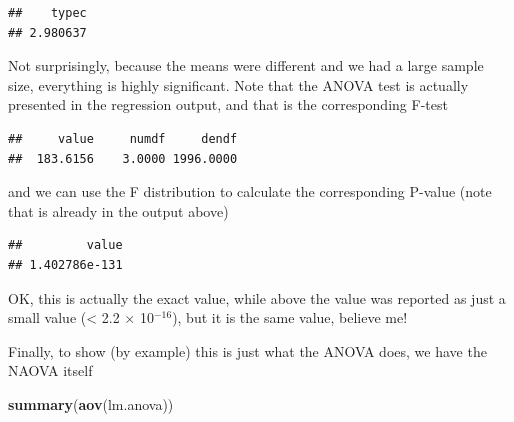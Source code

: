 \documentclass[
]{book}
\newenvironment{Shaded}{\begin{snugshade}}{\end{snugshade}}
\newcommand{\DecValTok}[1]{\textcolor[rgb]{0.00,0.00,0.81}{#1}}
\newcommand{\FunctionTok}[1]{\textcolor[rgb]{0.13,0.29,0.53}{\textbf{#1}}}
\newcommand{\NormalTok}[1]{#1}
\newcommand{\OtherTok}[1]{\textcolor[rgb]{0.56,0.35,0.01}{#1}}
\newcommand{\SpecialCharTok}[1]{\textcolor[rgb]{0.81,0.36,0.00}{\textbf{#1}}}
\begin{document}
\begin{verbatim}
##    typec 
## 2.980637
\end{verbatim}

Not surprisingly, because the means were different and we had a large sample size, everything is highly significant. Note that the ANOVA test is actually presented in the regression output, and that is the corresponding F-test

\begin{Shaded}
\end{Shaded}

\begin{verbatim}
##     value     numdf     dendf 
##  183.6156    3.0000 1996.0000
\end{verbatim}

and we can use the F distribution to calculate the corresponding P-value (note that is already in the output above)

\begin{Shaded}
\end{Shaded}

\begin{verbatim}
##         value 
## 1.402786e-131
\end{verbatim}

OK, this is actually the exact value, while above the value was reported as just a small value (\textless{} 2.2 \(\times\) 10\(^{-16}\)), but it is the same value, believe me!

Finally, to show (by example) this is just what the ANOVA does, we have the NAOVA itself

\begin{Shaded}
\begin{Highlighting}[]
\FunctionTok{summary}\NormalTok{(}\FunctionTok{aov}\NormalTok{(lm.anova))}
\end{Highlighting}
\end{Shaded}
\end{document}
